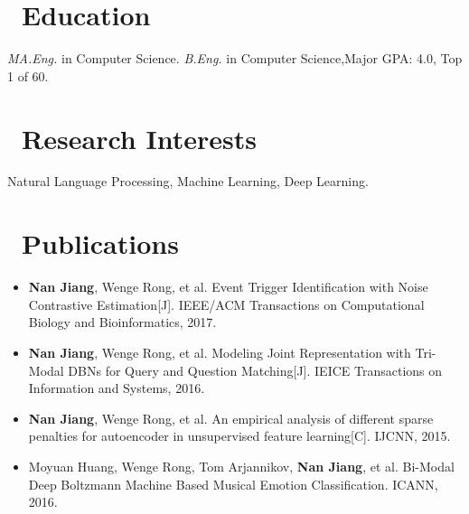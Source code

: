 \documentclass{resume}
\begin{document}



\section{\faGraduationCap\ Education }
\emph{MA.Eng.} in Computer Science.
\emph{B.Eng.} in Computer Science,\space Major GPA: 4.0, Top 1 of 60.

\section{\faLightbulbO\ Research Interests }
Natural Language Processing, Machine Learning, Deep Learning.

\section{\faBook\ Publications }
\begin{itemize}[parsep=0.5ex]
\item \textbf{Nan Jiang}, Wenge Rong, et al. Event Trigger Identification with Noise Contrastive Estimation[J]. IEEE/ACM Transactions on Computational Biology and Bioinformatics, 2017.

\item \textbf{Nan Jiang}, Wenge Rong, et al. Modeling Joint Representation with Tri-Modal DBNs for Query and Question Matching[J]. IEICE Transactions on Information and Systems, 2016.

\item \textbf{Nan Jiang}, Wenge Rong, et al. An empirical analysis of different sparse penalties for autoencoder in unsupervised feature learning[C]. IJCNN, 2015.

\item Moyuan Huang, Wenge Rong, Tom Arjannikov, \textbf{Nan Jiang}, et al. Bi-Modal Deep Boltzmann Machine Based Musical Emotion Classification. ICANN, 2016.

\end{itemize}
\end{document}
